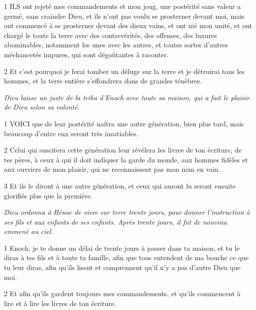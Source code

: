 \par 1 ILS ont rejeté mes commandements et mon joug, une postérité sans valeur a germé, sans craindre Dieu, et ils n'ont pas voulu se prosterner devant moi, mais ont commencé à se prosterner devant des dieux vains, et ont nié mon unité, et ont chargé le toute la terre avec des contrevérités, des offenses, des luxures abominables, notamment les unes avec les autres, et toutes sortes d'autres méchancetés impures, qui sont dégoûtantes à raconter.

\par 2 Et c'est pourquoi je ferai tomber un déluge sur la terre et je détruirai tous les hommes, et la terre entière s'effondrera dans de grandes ténèbres.


\par \textit{Dieu laisse un juste de la tribu d'Enoch avec toute sa maison, qui a fait le plaisir de Dieu selon sa volonté.}

\par 1 VOICI que de leur postérité naîtra une autre génération, bien plus tard, mais beaucoup d'entre eux seront très insatiables.

\par 2 Celui qui suscitera cette génération leur révélera les livres de ton écriture, de tes pères, à ceux à qui il doit indiquer la garde du monde, aux hommes fidèles et aux ouvriers de mon plaisir, qui ne reconnaissent pas mon nom en vain.

\par 3 Et ils le diront à une autre génération, et ceux qui auront lu seront ensuite glorifiés plus que la première.


\par \textit{Dieu ordonna à Hénoc de vivre sur terre trente jours, pour donner l'instruction à ses fils et aux enfants de ses enfants. Après trente jours, il fut de nouveau emmené au ciel.}

\par 1 Enoch, je te donne un délai de trente jours à passer dans ta maison, et tu le diras à tes fils et à toute ta famille, afin que tous entendent de ma bouche ce que tu leur diras, afin qu'ils lisent et comprennent qu'il n'y a pas d'autre Dieu que moi.

\par 2 Et afin qu'ils gardent toujours mes commandements, et qu'ils commencent à lire et à lire les livres de ton écriture.

